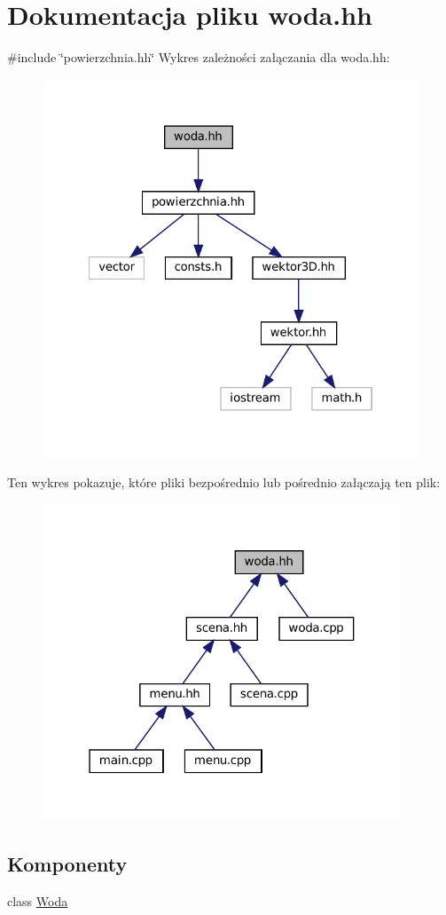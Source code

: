 \hypertarget{woda_8hh}{}\section{Dokumentacja pliku woda.\+hh}
\label{woda_8hh}
{\ttfamily \#include \char`\"{}powierzchnia.\+hh\char`\"{}}\newline
Wykres zależności załączania dla woda.\+hh\+:\nopagebreak
\begin{figure}[H]
\begin{center}
\leavevmode
\includegraphics[width=322pt]{woda_8hh__incl}
\end{center}
\end{figure}
Ten wykres pokazuje, które pliki bezpośrednio lub pośrednio załączają ten plik\+:
\nopagebreak
\begin{figure}[H]
\begin{center}
\leavevmode
\includegraphics[width=304pt]{woda_8hh__dep__incl}
\end{center}
\end{figure}
\subsection*{Komponenty}
\begin{DoxyCompactItemize}
\item 
class \mbox{\hyperlink{class_woda}{Woda}}
\end{DoxyCompactItemize}

